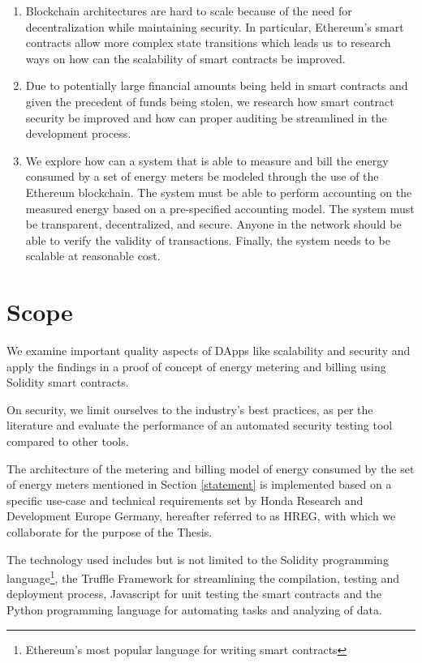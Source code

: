 \begin{enumerate}\label{statement}
    \item Blockchain architectures are hard to scale because of the need for decentralization while maintaining security. In particular, Ethereum's smart contracts allow more complex state transitions which leads us to research ways on how can the scalability of smart contracts be improved.
    \item Due to potentially large financial amounts being held in smart contracts and given the precedent of funds being stolen, we research how smart contract security be improved and how can proper auditing be streamlined in the development process.
    \item We explore how can a system that is able to measure and bill the energy consumed by a set of energy meters be modeled through the use of the Ethereum blockchain. The system must be able to perform accounting on the measured energy based on a pre-specified accounting model. The system must be transparent, decentralized, and secure. Anyone in the network should be able to verify the validity of transactions. Finally, the system needs to be scalable at reasonable cost.
\end{enumerate}

\section{Scope}
We examine important quality aspects of DApps like scalability and security and apply the findings in a proof of concept of energy metering and billing using Solidity smart contracts. 


On security, we limit ourselves to the industry's best practices, as per the literature and evaluate the performance of an automated security testing tool compared to other tools.

The architecture of the metering and billing model of energy consumed by the set of energy meters mentioned in Section \ref{statement} is implemented based on a specific use-case and technical requirements set by Honda Research and Development Europe Germany, hereafter referred to as HREG, with which we collaborate for the purpose of the Thesis.

The technology used includes but is not limited to the Solidity programming language\footnote{Ethereum's most popular language for writing smart contracts}, the Truffle Framework for streamlining the compilation, testing and deployment process, Javascript for unit testing the smart contracts and the Python programming language for automating tasks and analyzing of data.

